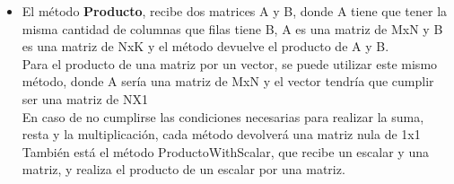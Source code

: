 \documentclass[12pt, a4paper]{article}
\begin{document}
\begin{enumerate}
\begin{itemize}
                  \item El método \textbf{Producto}, recibe dos matrices A y B, donde A tiene que tener la misma
                        cantidad de columnas que filas tiene B, A es una matriz de MxN y B es una matriz
                        de NxK y el método devuelve el producto de A y B.\\
                        Para el producto de una matriz por un vector, se puede utilizar este mismo método,
                        donde A sería una matriz de MxN y el vector tendría que cumplir ser una matriz
                        de NX1\\
                        En caso de no cumplirse las condiciones necesarias para realizar la suma, resta y
                        la multiplicación, cada método devolverá una matriz nula de 1x1\\
                        También está el método ProductoWithScalar,
                        que recibe un escalar y una matriz, y realiza el producto de un escalar por una
                        matriz.

            \end{itemize}







\end{enumerate}
\end{document}
